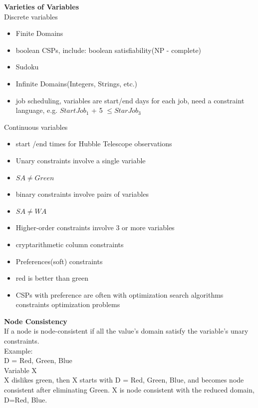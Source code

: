 \textbf{Varieties of Variables}\\
Discrete variables
\begin{itemize}
\item Finite Domains
\item boolean CSPs, include: boolean satisfiability(NP - complete)
\item Sudoku
\item Infinite Domains(Integers, Strings, etc.)

\item job scheduling, variables are start/end days for each job, need a constraint language, e.g. $StartJob_1$ + 5 $\leq  StarJob_3$
\end{itemize}
Continuous variables
\begin{itemize}
\item start /end times for Hubble Telescope observations
\item Unary constraints involve a single variable
\setlength{\itemindent}{3em}
\item $SA \neq Green$
\setlength{\itemindent}{0em}
\item binary constraints involve pairs of variables
\setlength{\itemindent}{3em}
\item $SA \neq WA$
\setlength{\itemindent}{0em}
\item Higher-order constraints involve 3 or more variables	
\setlength{\itemindent}{3em}
\item cryptarithmetic column constraints
\setlength{\itemindent}{0em}
\item Preferences(soft) constraints
\setlength{\itemindent}{3em}
\item red  is better than green
\item CSPs with preference are often with optimization search algorithms constraints optimization problems 
\end{itemize}

\textbf{Node Consistency}\\
If a node is node-consistent if all the value’s domain satisfy the variable’s unary constraints.\\[3ex]

Example:\\
D = {Red, Green, Blue}\\
Variable X\\
X dislikes green, then X starts with D = {Red, Green, Blue}, and becomes node consistent after eliminating {Green}.
X is node consistent with the reduced domain, D={Red, Blue}.\\

